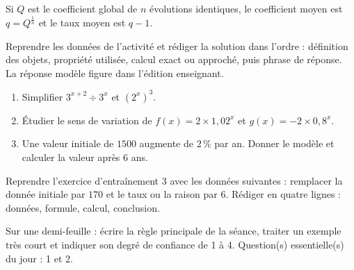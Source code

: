 \begin{traceecrite}Si $Q$ est le coefficient global de $n$ évolutions identiques, le coefficient moyen est $q=Q^{\frac1n}$ et le taux moyen est $q-1$.\end{traceecrite}

\begin{exemple}
Reprendre les données de l'activité et rédiger la solution dans l'ordre : définition des objets, propriété utilisée, calcul exact ou approché, puis phrase de réponse. La réponse modèle figure dans l'édition enseignant.
\end{exemple}

\begin{exercice}[-- essentiel]
\begin{enumerate}\item Simplifier $3^{x+2}\div3^x$ et $(2^x)^3$.\item Étudier le sens de variation de $f(x)=2\times1{,}02^x$ et $g(x)=-2\times0{,}8^x$.\item Une valeur initiale de $1500$ augmente de $2\,\%$ par an. Donner le modèle et calculer la valeur après $6$ ans.\end{enumerate}
\end{exercice}


\begin{dm}Reprendre l'exercice d'entraînement 3 avec les données suivantes : remplacer la donnée initiale par $170$ et le taux ou la raison par $6$. Rédiger en quatre lignes : données, formule, calcul, conclusion.\end{dm}

\begin{sortie}Sur une demi-feuille : écrire la règle principale de la séance, traiter un exemple très court et indiquer son degré de confiance de 1 à 4. Question(s) essentielle(s) du jour : 1 et 2.\end{sortie}

